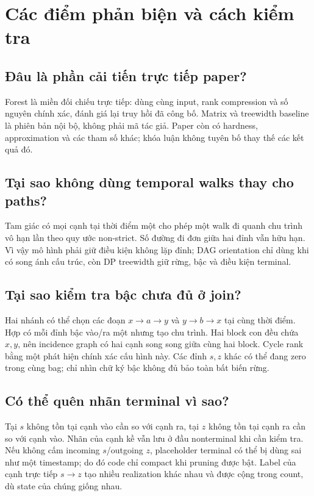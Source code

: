 \chapter{Các điểm phản biện và cách kiểm tra}

\section{Đâu là phần cải tiến trực tiếp paper?}

Forest là miền đối chiếu trực tiếp: dùng cùng input, rank compression và số nguyên chính xác, đánh giá lại truy hồi đã công bố. Matrix và treewidth baseline là phiên bản nội bộ, không phải mã tác giả. Paper còn có hardness, approximation và các tham số khác; khóa luận không tuyên bố thay thế các kết quả đó.

\section{Tại sao không dùng temporal walks thay cho paths?}

Tam giác có mọi cạnh tại thời điểm một cho phép một walk đi quanh chu trình vô hạn lần theo quy ước non-strict. Số đường đi đơn giữa hai đỉnh vẫn hữu hạn. Vì vậy mô hình phải giữ điều kiện không lặp đỉnh; DAG orientation chỉ dùng khi có song ánh cấu trúc, còn DP treewidth giữ rừng, bậc và điều kiện terminal.

\section{Tại sao kiểm tra bậc chưa đủ ở join?}

Hai nhánh có thể chọn các đoạn $x\to a\to y$ và $y\to b\to x$ tại cùng thời điểm. Hợp có mỗi đỉnh bậc vào/ra một nhưng tạo chu trình. Hai block con đều chứa $x,y$, nên incidence graph có hai cạnh song song giữa cùng hai block. Cycle rank bằng một phát hiện chính xác cấu hình này. Các đỉnh $s,z$ khác có thể đang zero trong cùng bag; chỉ nhìn chữ ký bậc không đủ bảo toàn bất biến rừng.

\section{Có thể quên nhãn terminal vì sao?}

Tại $s$ không tồn tại cạnh vào cần so với cạnh ra, tại $z$ không tồn tại cạnh ra cần so với cạnh vào. Nhãn của cạnh kề vẫn lưu ở đầu nonterminal khi cần kiểm tra. Nếu không cấm incoming $s$/outgoing $z$, placeholder terminal có thể bị dùng sai như một timestamp; do đó code chỉ compact khi pruning được bật. Label của cạnh trực tiếp $s\to z$ tạo nhiều realization khác nhau và được cộng trong count, dù state của chúng giống nhau.

